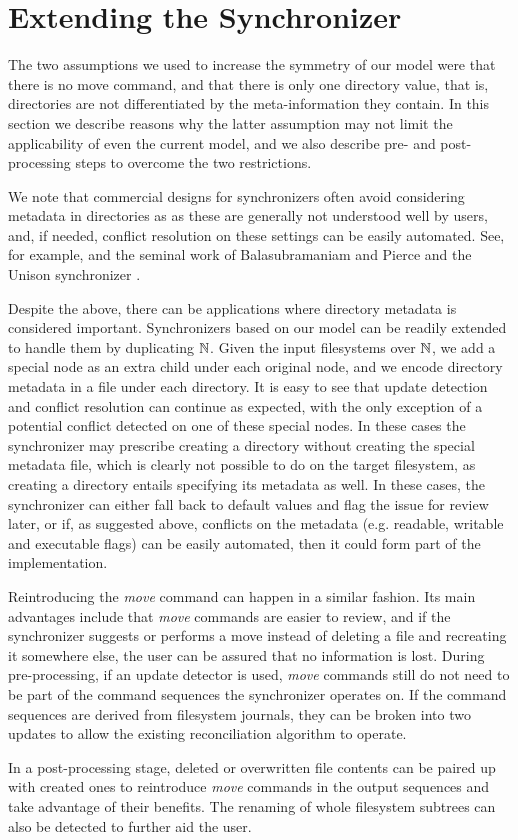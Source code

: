 
\section{Extending the Synchronizer}

The two assumptions we used to increase the symmetry of our model were
that there is no move command,
and that
there is only one directory value, that is, directories are not differentiated
by the meta-information they contain.
In this section we describe reasons why the latter assumption may not limit the applicability
of even the current model, and we also describe pre- and post-processing steps
to overcome the two restrictions.

We note that commercial designs for synchronizers 
often avoid considering metadata in directories as
as these are generally not understood well by users,
and, if needed, conflict resolution on these settings can be easily automated.
See, for example, \cite{BZ} and the seminal work of Balasubramaniam and Pierce and the Unison synchronizer \cite{BP}.

Despite the above, there can be applications where directory metadata
is considered important.
Synchronizers based on our model can be readily extended to handle them
by duplicating $\mathbb{N}$. 
Given the input filesystems over $\mathbb{N}$, we add a special node as an extra child under each original node,
and we encode directory metadata in a file under each directory.
It is easy to see that update detection and conflict resolution can continue as expected,
with the only exception of a potential conflict detected on one of these special nodes.
In these cases the synchronizer may prescribe creating a directory without creating
the special metadata file, which is clearly not possible to do on the target filesystem,
as creating a directory entails specifying its metadata as well.
In these cases, the synchronizer can either fall back to default values and flag the issue
for review later, or if, as suggested above, conflicts on the metadata (e.g. readable, writable and executable flags)
can be easily automated, then it could form part of the implementation.

Reintroducing the \emph{move} command can happen in a similar fashion.
Its main advantages include that 
\emph{move} commands are easier to review,
and if the synchronizer suggests or performs a move instead
of deleting a file and recreating it somewhere else, the user
can be assured that no information is lost.
During pre-processing, if an update detector is used,
\emph{move} commands still do not need to be part of the command sequences
the synchronizer operates on.
If the command sequences are derived from filesystem journals, they
can be broken into two updates to allow the existing reconciliation
algorithm to operate.

In a post-processing stage, deleted or overwritten file contents
can be paired up with created ones to reintroduce \emph{move}
commands in the output sequences and take advantage of their benefits.
The renaming of whole filesystem subtrees can also be detected
to further aid the user.
